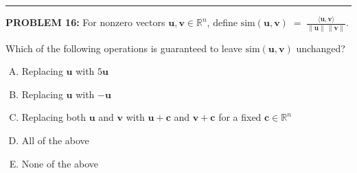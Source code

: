 \documentclass[12pt]{amsart}
\newcommand{\divider}{
  \vspace{-1em} %
  \noindent
  \raisebox{-0.15ex}{\textbullet}%
  \hspace{0.5em}%
  \rule[0.5ex]{0.95\textwidth}{1.0pt}%
  \hspace{0.5em}%
  \raisebox{-0.15ex}{\textbullet}%
  \vspace{0em} %
}
\begin{document}
\divider

{\bf PROBLEM 16:}
%
For nonzero vectors $\mathbf{u}, \mathbf{v} \in \mathbb{R}^n$, define
$\mathrm{sim}(\mathbf{u}, \mathbf{v}) \;=\; \displaystyle \frac{\langle \mathbf{u}, \mathbf{v} \rangle}{\|{\mathbf{u}}\|\,\|{\mathbf{v}}\|}$.

Which of the following operations is guaranteed to leave $\mathrm{sim}(\mathbf{u},\mathbf{v})$ unchanged?
%
\begin{enumerate}[(A)]
\item Replacing $\mathbf{u}$ with $5\mathbf{u}$
\item Replacing $\mathbf{u}$ with $-\mathbf{u}$
\item Replacing both $\mathbf{u}$ and $\mathbf{v}$ with $\mathbf{u} + \mathbf{c}$ and $\mathbf{v} + \mathbf{c}$ for a fixed $\mathbf{c} \in \mathbb{R}^n$
\item All of the above
\item None of the above
\end{enumerate}
%
%
%
%
%
%
\end{document}

